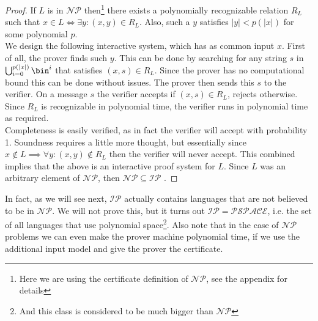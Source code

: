 \documentclass{article}
\begin{document}
\begin{proof}
If $L$ is in $\mathcal{NP}$ then\footnote{Here we are using the certificate definition of $\mathcal{NP}$, see the appendix for details} there exists a polynomially recognizable relation $R_L$ such that $x \in L \iff \exists y : (x, y) \in R_L$. Also, such a $y$ satisfies $|y| < p(|x|)$ for some polynomial $p$. \\
We design the following interactive system, which has as common input $x$. 
First of all, the prover finds such $y$. This can be done by searching for any string $s$ in $ \bigcup_{i = 0}^{p(|x|)} \bin^i$ that satisfies $(x, s) \in R_L$. Since the prover has no computational bound this can be done without issues. The prover then sends this $s$ to the verifier. On a message $s$ the verifier accepts if $(x, s) \in R_L$, rejects otherwise. Since $R_L$ is recognizable in polynomial time, the verifier runs in polynomial time as required.  \\ 
Completeness is easily verified, as in fact the verifier will accept with probability 1. Soundness requires a little more thought, but essentially since $x \notin L \implies \forall y : (x, y) \notin R_L $ then the verifier will never accept. This combined implies that the above is an interactive proof system for $L$. Since $L$ was an arbitrary element of $\mathcal{NP}$, then $\mathcal{NP} \subseteq \mathcal{IP}$ .
\end{proof}
In fact, as we will see next, $\mathcal{IP}$ actually contains languages that are not believed to be in $\mathcal{NP}$. We will not prove this, but it turns out $\mathcal{IP} = \mathcal{PSPACE}$, i.e. the set of all languages that use polynomial space\footnote{And this class is considered to be much bigger than $\mathcal{NP}$}. Also note that in the case of $\mathcal{NP}$ problems we can even make the prover machine polynomial time, if we use the additional input model and give the prover the certificate. 
\end{document}
